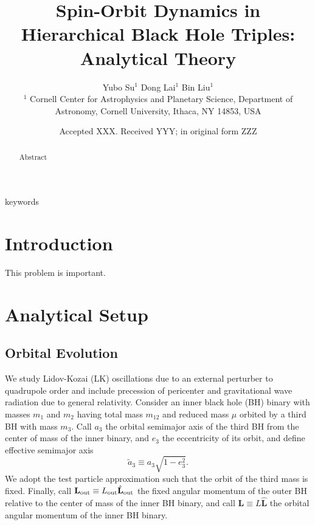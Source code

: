 \documentclass[
        fleqn,
        usenatbib,
    ]{mnras}
\title[BH Triple Spin-Orbit Dynamics]{Spin-Orbit Dynamics in Hierarchical Black
Hole Triples: Analytical Theory}
\author[Authors]{
Yubo Su$^1$
Dong Lai$^1$
Bin Liu$^1$
\\
$^1$ Cornell Center for Astrophysics and Planetary Science, Department of
Astronomy, Cornell University, Ithaca, NY 14853, USA
}
\date{Accepted XXX\@. Received YYY\@; in original form ZZZ}
\newcommand*{\bm}[1]{\boldsymbol{\mathbf{#1}}}
\newcommand*{\uv}[1]{\hat{\bm{#1}}}
\begin{document}
\label{firstpage}
\pagerange{\pageref{firstpage}--\pageref{lastpage}}
\maketitle

\begin{abstract}
    Abstract
\end{abstract}

\begin{keywords}
keywords %
\end{keywords}

\section{Introduction}

This problem is important.

\section{Analytical Setup}

\subsection{Orbital Evolution}

We study Lidov-Kozai (LK) oscillations due to an external perturber to
quadrupole order and include precession of pericenter and gravitational wave
radiation due to general relativity. Consider an inner black hole (BH) binary
with masses $m_1$ and $m_2$ having total mass $m_{12}$ and reduced mass $\mu$
orbited by a third BH with mass $m_3$. Call $a_3$ the orbital semimajor axis of
the third BH from the center of mass of the inner binary, and $e_3$ the
eccentricity of its orbit, and define effective semimajor axis
\begin{equation}
    \tilde{a}_3 \equiv a_3\sqrt{1 - e_3^2}.
\end{equation}
We adopt the test particle approximation such that the orbit of the third mass
is fixed. Finally, call $\bm{L}_{\rm out} \equiv L_{\rm out} \uv{L}_{\rm out}$
the fixed angular momentum of the outer BH relative to the center of mass of the
inner BH binary, and call $\bm{L} \equiv L \uv{L}$ the orbital angular momentum
of the inner BH binary.
\end{document}
